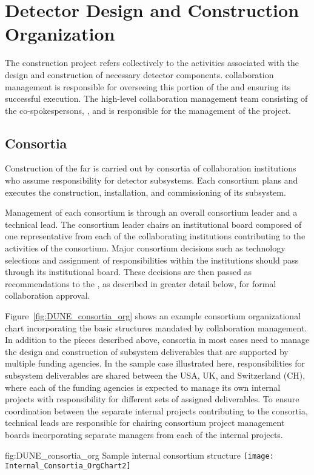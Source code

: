 \chapter{Detector Design and Construction Organization}
\label{vl:tc-overview}

The   construction project refers collectively 
to the activities associated with the design and construction of 
necessary detector components.   collaboration management 
is responsible for overseeing this portion of the  and 
ensuring its successful execution.  The high-level  
collaboration management team consisting of the co-spokespersons, 
, and  is responsible for the
management of the project.  

\section{ Consortia}
\label{sec:consortia}

Construction of the  far  is carried out by 
consortia of collaboration institutions who assume responsibility 
for detector subsystems.  Each consortium plans and executes the 
construction, installation, and commissioning of its subsystem.

Management of each consortium is through an overall consortium leader 
and a technical lead.  The consortium leader chairs an institutional 
board composed of one representative from each of the collaborating 
institutions contributing to the activities of the consortium.  Major 
consortium decisions such as technology selections and assignment of 
responsibilities within the institutions should pass %
through its institutional board.  These decisions are then passed 
as recommendations to the  , as described in 
greater detail below, for formal collaboration approval.

Figure~\ref{fig:DUNE_consortia_org} shows an example consortium 
organizational chart incorporating the basic structures mandated 
by  collaboration management.  In addition to the pieces 
described above, consortia in most cases need to manage the design 
and construction of subsystem deliverables that are supported by 
multiple funding agencies.  In the sample case illustrated here, 
responsibilities for subsystem deliverables are shared between the 
USA, UK, and Switzerland (CH), where each of the funding agencies 
is expected to manage its own internal projects with responsibility 
for different sets of assigned deliverables.  To ensure coordination 
between the separate internal projects contributing to the consortia, 
technical leads are responsible for chairing consortium project 
management boards incorporating separate managers from each of 
the internal projects.   
\begin{dunefigure}{fig:DUNE_consortia_org}
  {Sample  internal consortium structure}
  \texttt{[image: Internal\_Consortia\_OrgChart2]}
\end{dunefigure}

